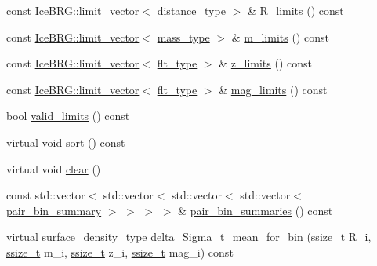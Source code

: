\begin{DoxyCompactItemize}
const \hyperlink{classIceBRG_1_1limit__vector}{Ice\+B\+R\+G\+::limit\+\_\+vector}$<$ \hyperlink{namespaceIceBRG_a45499647eb87e24c10ab32c628711cec}{distance\+\_\+type} $>$ \& \hyperlink{classIceBRG_1_1pair__bins__summary_acc7b46adaf08cb9026ae6cb629149a03}{R\+\_\+limits} () const 
\item 
const \hyperlink{classIceBRG_1_1limit__vector}{Ice\+B\+R\+G\+::limit\+\_\+vector}$<$ \hyperlink{namespaceIceBRG_a1be72ac4918a9b029f2eefa084213e35}{mass\+\_\+type} $>$ \& \hyperlink{classIceBRG_1_1pair__bins__summary_a86827c9706e81ed9355e2392c8f97461}{m\+\_\+limits} () const 
\item 
const \hyperlink{classIceBRG_1_1limit__vector}{Ice\+B\+R\+G\+::limit\+\_\+vector}$<$ \hyperlink{lib_2IceBRG__main_2common_8h_ad0f130a56eeb944d9ef2692ee881ecc4}{flt\+\_\+type} $>$ \& \hyperlink{classIceBRG_1_1pair__bins__summary_a6e991158024292432a331e17afe7772d}{z\+\_\+limits} () const 
\item 
const \hyperlink{classIceBRG_1_1limit__vector}{Ice\+B\+R\+G\+::limit\+\_\+vector}$<$ \hyperlink{lib_2IceBRG__main_2common_8h_ad0f130a56eeb944d9ef2692ee881ecc4}{flt\+\_\+type} $>$ \& \hyperlink{classIceBRG_1_1pair__bins__summary_ae901835c073a1b9080d5fc9d372cb076}{mag\+\_\+limits} () const 
\item 
bool \hyperlink{classIceBRG_1_1pair__bins__summary_aee577469277b57e336d06c0a55362af1}{valid\+\_\+limits} () const 
\item 
virtual void \hyperlink{classIceBRG_1_1pair__bins__summary_a02eff77640a691bae15d619cd138aec4}{sort} () const 
\item 
virtual void \hyperlink{classIceBRG_1_1pair__bins__summary_a5c15793df751321aef8bed2526c3cbe6}{clear} ()
\item 
const std\+::vector$<$ std\+::vector$<$ std\+::vector$<$ std\+::vector$<$ \hyperlink{classIceBRG_1_1pair__bin__summary}{pair\+\_\+bin\+\_\+summary} $>$ $>$ $>$ $>$ \& \hyperlink{classIceBRG_1_1pair__bins__summary_a50f037d0f5014adb5eb4e7c4d0b0092e}{pair\+\_\+bin\+\_\+summaries} () const 
\item 
virtual \hyperlink{namespaceIceBRG_a80c597ef5ba0a32491d32a9f0083b02d}{surface\+\_\+density\+\_\+type} \hyperlink{classIceBRG_1_1pair__bins__summary_a6b03be80b8d12b5d8ef4707e594fa911}{delta\+\_\+\+Sigma\+\_\+t\+\_\+mean\+\_\+for\+\_\+bin} (\hyperlink{lib_2IceBRG__main_2common_8h_ab322a3e50421dc5f0c43316b1b373592}{ssize\+\_\+t} R\+\_\+i, \hyperlink{lib_2IceBRG__main_2common_8h_ab322a3e50421dc5f0c43316b1b373592}{ssize\+\_\+t} m\+\_\+i, \hyperlink{lib_2IceBRG__main_2common_8h_ab322a3e50421dc5f0c43316b1b373592}{ssize\+\_\+t} z\+\_\+i, \hyperlink{lib_2IceBRG__main_2common_8h_ab322a3e50421dc5f0c43316b1b373592}{ssize\+\_\+t} mag\+\_\+i) const 

\end{DoxyCompactItemize}
